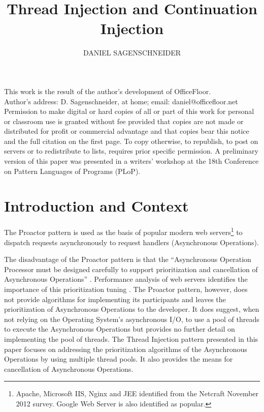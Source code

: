 \documentclass[prodmode]{style/acmlarge}
\title{Thread Injection and Continuation Injection}
\author{DANIEL SAGENSCHNEIDER \affil{daniel@officefloor.net}}
\begin{document}
\begin{bottomstuff}
This work is the result of the author's development of OfficeFloor.\\
Author's address: D. Sagenschneider, at home; email: daniel@officefloor.net\\

Permission to make digital or hard copies of all or part of this work for
personal or classroom use is granted without fee provided that copies are not
made or distributed for profit or commercial advantage and that copies bear this
notice and the full citation on the first page. To copy otherwise, to republish,
to post on servers or to redistribute to lists, requires prior specific
permission. A preliminary version of this paper was presented in a writers'
workshop at the 18th Conference on Pattern Languages of Programs (PLoP).
\end{bottomstuff}

\maketitle

\section{Introduction and Context}

The Proactor pattern \cite{proactor} is used as the basis of popular modern web
servers\footnote{Apache, Microsoft IIS, Nginx and JEE identified from the
Netcraft November 2012 survey.  Google Web Server is also identified as
popular.} to dispatch requests asynchronously to request handlers (Asynchronous
Operations).

The disadvantage of the Proactor pattern is that the ``Asynchronous Operation
Processor must be designed carefully to support prioritization and cancellation
of Asynchronous Operations'' \cite[p. 8]{proactor}.  Performance analysis of web
servers identifies the importance of this prioritization tuning
\cite{tuning-important,low-server-footprint,tuning-os-important}. The Proactor
pattern, however, does not provide algorithms for implementing its participants
and leaves the prioritization of Asynchronous Operations to the developer.  It
does suggest, when not relying on the Operating System's asynchronous I/O, to
use a pool of threads to execute the Asynchronous Operations but provides no
further detail on implementing the pool of threads.  The Thread Injection
pattern presented in this paper focuses on addressing the prioritization
algorithms of the Asynchronous Operations by using multiple thread pools.  It
also provides the means for cancellation of Asynchronous Operations.
\end{document}
